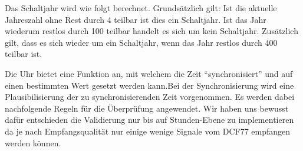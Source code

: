Das Schaltjahr wird wie folgt berechnet. Grundsätzlich gilt: Ist die aktuelle Jahreszahl ohne Rest durch 4 teilbar ist dies ein Schaltjahr. Ist das Jahr wiederum restlos durch 100 teilbar handelt es sich um kein Schaltjahr. Zusätzlich gilt, dass es sich wieder um ein Schaltjahr, wenn das Jahr restlos durch 400 teilbar ist.

Die Uhr bietet eine Funktion an, mit welchem die Zeit "`synchronisiert"' und auf einen bestimmten Wert gesetzt werden kann.Bei der Synchronisierung wird eine Plausibilisierung der zu synchronisierenden Zeit vorgenommen. Es werden dabei nachfolgende Regeln für die Überprüfung angewendet. Wir haben uns bewusst dafür entschieden die Validierung nur bis auf Stunden-Ebene zu implementieren da je nach Empfangsqualität nur einige wenige Signale vom DCF77 empfangen werden können.

